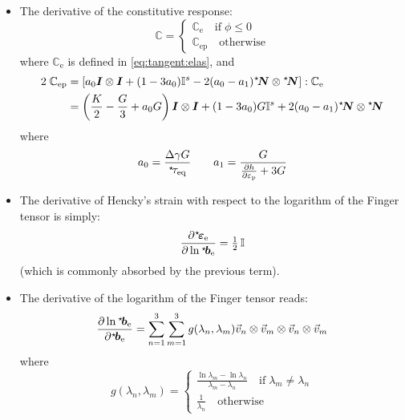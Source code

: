 \documentclass[namecite, fleqn]{goose-article}
\newcommand\ST[1]{\hspace*{-.3em}~^\star\!#1}
\newcommand\T[1]{\bm{{#1}}}
\newcommand\TT[1]{\mathbb{{#1}}}
\begin{document}
\begin{itemize}

    \item The derivative of the constitutive response:
    \begin{equation}
        \TT{C} =
        \begin{cases}
            \TT{C}_\mathrm{e} \quad\mathrm{if}\; \phi \leq 0 \\
            \TT{C}_\mathrm{ep} \quad\mathrm{otherwise}
        \end{cases}
    \end{equation}
    where $\TT{C}_\mathrm{e}$ is defined in \cref{eq:tangent:elas}, and
    \begin{align}
        2 \; \TT{C}_\mathrm{ep}
        &= \left[
            a_0 \T{I} \otimes \T{I}
            + (1 - 3 a_0) \TT{I}^s - 2 (a_0 - a_1) \ST{\T{N}} \otimes \ST{\T{N}}
        \right] : \TT{C}_\mathrm{e}
        \\
        &= \left( \frac{K}{2} - \frac{G}{3} + a_0 G \right) \T{I} \otimes \T{I}
        + (1 - 3 a_0) G \TT{I}^s + 2 (a_0 - a_1) \ST{\T{N}} \otimes \ST{\T{N}}
    \end{align}
    where
    \begin{equation}
        a_0 = \frac{\Delta \gamma G}{\ST{\tau}_\mathrm{eq}}
        \qquad
        a_1 = \frac{G}{\frac{\partial h}{\partial \varepsilon_\mathrm{p}} + 3 G}
    \end{equation}

    \item The derivative of Hencky’s strain with respect to the logarithm
    of the Finger tensor is simply:
    \begin{equation}
        \frac{\partial \ST{\T{\varepsilon}}_\mathrm{e}}{\partial \ln \ST{\T{b}}_\mathrm{e}}
        = \tfrac{1}{2} \, \TT{I}
    \end{equation}
    (which is commonly absorbed by the previous term).

    \item The derivative of the logarithm of the Finger tensor reads:
    \begin{equation}
        \frac{\partial \ln \ST{\T{b}}_\mathrm{e}}{\partial \ST{\T{b}}_\mathrm{e}}
        = \sum\limits_{n=1}^3 \sum\limits_{m=1}^3
        g(\lambda_n, \lambda_m) \vec{v}_n \otimes \vec{v}_m \otimes \vec{v}_n \otimes \vec{v}_m
    \end{equation}
    where
    \begin{equation}
        g(\lambda_n, \lambda_m) =
        \begin{cases}
            \displaystyle
            \frac{\ln \lambda_m - \ln \lambda_n}{\lambda_m - \lambda_n}
            \quad\mathrm{if}\; \lambda_m \neq \lambda_n \\
            \displaystyle \frac{1}{\lambda_n}
            \quad\mathrm{otherwise}
        \end{cases}
    \end{equation}


\end{itemize}
\end{document}

